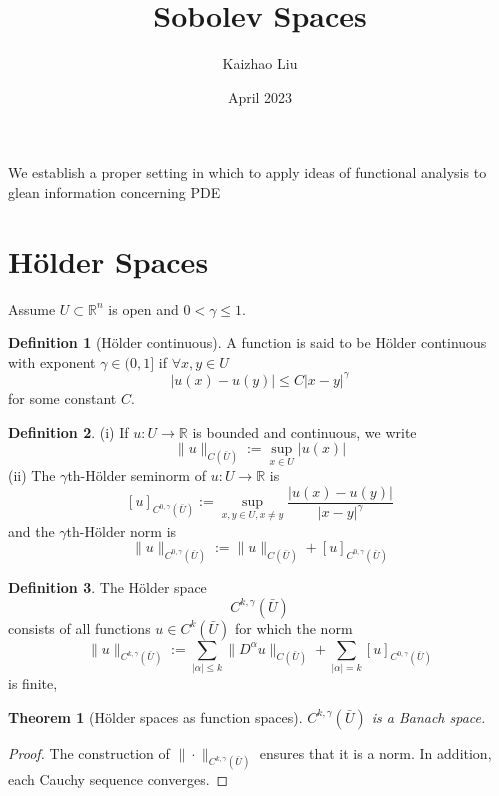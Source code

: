 \documentclass{article}
\title{Sobolev Spaces}
\author{Kaizhao Liu}
\date{April 2023}
\newtheorem{theorem}{Theorem}[section]
\theoremstyle{definition}
\newtheorem{definition}{Definition}[section]
\begin{document}
\maketitle

We establish a proper setting in which to apply ideas of functional analysis to glean information concerning PDE

\tableofcontents

\section{H\"older Spaces}
Assume $U\subset \mathbb{R}^n$ is open and $0<\gamma\le 1$. 
\begin{definition}[H\"older continuous]
    A function is said to be H\"older continuous with exponent $\gamma\in (0,1]$ if $\forall x,y\in U$
    \begin{equation}
        |u(x)-u(y)|\le C|x-y|^\gamma
    \end{equation}
    for some constant $C$.    
\end{definition}

\begin{definition}
    (i) If $u:U\to\mathbb{R}$ is bounded and continuous, we write 
    \[\|u\|_{C(\bar{U})}:=\sup_{x\in U}|u(x)|\] 
    (ii) The $\gamma$th-H\"older seminorm of $u:U\to\mathbb{R}$ is 
    \[[u]_{C^{0,\gamma}(\bar{U})}:=\sup_{x,y\in U,x\ne y} \frac{|u(x)-u(y)|}{|x-y|^\gamma}\] 
    and the $\gamma$th-H\"older norm is 
    \[\|u\|_{C^{0,\gamma}(\bar{U})}:= \|u\|_{C(\bar{U})}+[u]_{C^{0,\gamma}(\bar{U})}\]
\end{definition}

\begin{definition}
    The H\"older space \[C^{k,\gamma}(\bar{U})\] consists of all functions $u\in C^k(\bar{U})$ for which the norm 
    \[ \|u\|_{C^{k,\gamma}(\bar{U})}:= \sum_{|\alpha|\le k}\|D^\alpha u\|_{C(\bar{U})}+\sum_{|\alpha|= k}[u]_{C^{0,\gamma}(\bar{U})}\]
    is finite,
\end{definition}

\begin{theorem}[H\"older spaces as function spaces]
    $C^{k,\gamma}(\bar{U})$ is a Banach space.
\end{theorem}
\begin{proof}
    The construction of $\|\cdot\|_{C^{k,\gamma}(\bar{U})}$ ensures that it is a norm. 
    In addition, each Cauchy sequence converges.
\end{proof}
\end{document}
